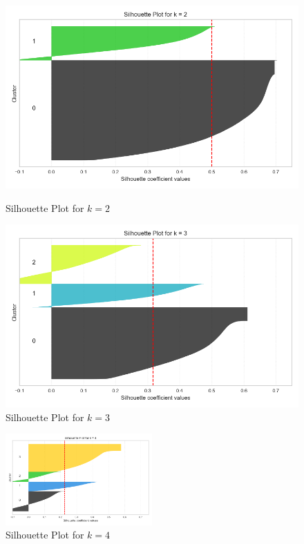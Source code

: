 \documentclass{article}
\begin{document}
\begin{figure}[H]
    \centering
    \begin{minipage}{0.50\textwidth}
        \centering
        \includegraphics[width=\linewidth]{figures/silhouette_k2.png}
        \caption{Silhouette Plot for $k=2$}
        \label{fig:silhouette_k2}
    \end{minipage}\hfill
    \begin{minipage}{0.50\textwidth}
        \centering
        \includegraphics[width=\linewidth]{figures/silhouette_k3.png}
        \caption{Silhouette Plot for $k=3$}
        \label{fig:silhouette_k3}
    \end{minipage}
\end{figure}

\begin{figure}[H]
    \centering
    \includegraphics[width=0.50\textwidth]{figures/silhouette_k4.png}
    \caption{Silhouette Plot for $k=4$}
    \label{fig:silhouette_k4}
\end{figure}
\end{document}
